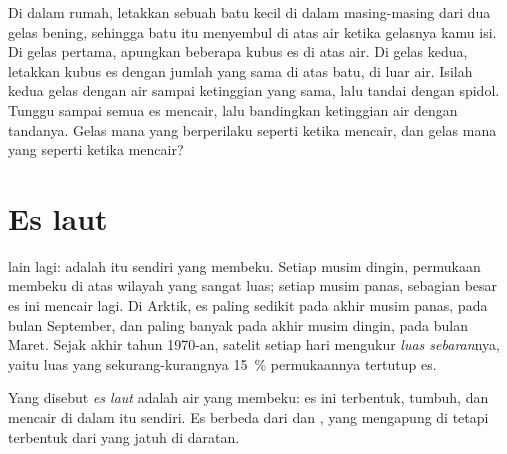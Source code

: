 \begin{inthelab}
Di dalam rumah, letakkan sebuah batu kecil di dalam masing-masing dari
dua gelas bening, sehingga batu itu menyembul di atas air ketika gelasnya
kamu isi. Di gelas pertama, apungkan beberapa kubus es di atas air. Di
gelas kedua, letakkan kubus es dengan jumlah yang sama di atas batu, di
luar air. Isilah kedua gelas dengan air sampai ketinggian yang sama, lalu
tandai dengan spidol. Tunggu sampai semua es mencair, lalu bandingkan
ketinggian air dengan tandanya. Gelas mana yang berperilaku seperti 
ketika  mencair, dan gelas mana yang seperti  ketika  mencair?
\end{inthelab}

\section{Es laut}

 lain lagi:  adalah  itu sendiri yang membeku. Setiap
musim dingin, permukaan   membeku di atas wilayah yang sangat
luas; setiap musim panas, sebagian besar es ini mencair lagi. Di Arktik,
es paling sedikit pada akhir musim panas, pada bulan September, dan paling
banyak pada akhir musim dingin, pada bulan Maret. Sejak akhir tahun
1970-an, satelit setiap hari mengukur \emph{luas sebaran}nya, yaitu luas
 yang sekurang-kurangnya 15~\% permukaannya tertutup es.

\begin{definition}[Es laut]\label{def:g8:ice-on-earth:sea-ice}
Yang disebut \emph{es laut} adalah air  yang membeku:
es ini terbentuk, tumbuh, dan mencair di dalam  itu sendiri. Es
 berbeda dari  dan , yang mengapung di  tetapi
terbentuk dari  yang jatuh di daratan.
\end{definition}

